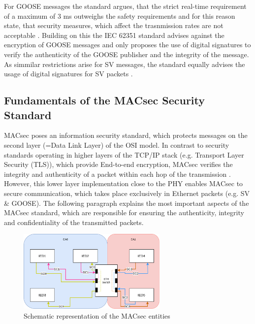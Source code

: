 \documentclass[conference, onecolumn, a4paper]{IEEEtran}
\begin{document}
\smallskip
For GOOSE messages the standard argues, that the strict real-time requirement of a maximum of 3 ms \cite{GOOSE_confidentiality_integrity:2020} outweighs 
the safety requirements and for this reason state, that security measures, which affect the trasnmission rates are not acceptable \cite{PoisonedGOOSE:2014}. 
Building on this the IEC 62351 standard advises against the encryption of GOOSE messages and only proposes the use of digital signatures to verify the 
authenticity of the GOOSE publisher and the integrity of the message. As simmilar restrictions arise for SV messages, the standard equally advises the 
usage of digital signatures for SV packets \cite{Review_IEC62351:2019}. 

\subsection{Fundamentals of the MACsec Security Standard}
\noindent MACsec poses an information security standard, which protects messages on the second layer (=Data Link Layer) of the OSI model. In contrast 
to security standards operating in higher layers of the TCP/IP stack (e.g. Transport Layer Security (TLS)), which provide End-to-end encryption, MACsec 
verifies the integrity and authenticity of a packet within each hop of the transmission \cite{Cybersecurity_Substation:2016}. However, this lower layer 
implementation close to the PHY enables MACsec to secure communication, which takes place exclusively in Ethernet packets (e.g. SV \& GOOSE). The 
following paragraph explains the most important aspects of the MACsec standard, which are responsible for ensuring the authenticity, integrity and 
confidentiality of the transmitted packets.

\begin{figure}[h]
    \centering
    \includegraphics[width=0.65\textwidth]{images/MACsec_Entities_Diagram.png}
    \caption{Schematic representation of the MACsec entities \cite{IEEE-802-1AE:2018}}
    \label{image:MACsecEntities}
\end{figure}
\end{document}
